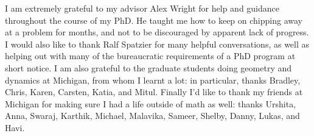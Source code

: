 
I am extremely grateful to my advisor Alex Wright for help and guidance throughout the course of my PhD.
He taught me how to keep on chipping away at a problem for months, and not to be discouraged by apparent lack of progress.
I would also like to thank Ralf Spatzier for many helpful conversations, as well as helping out with many of the bureaucratic requirements of a PhD program at short notice.
I am also grateful to the graduate students doing geometry and dynamics at Michigan, from whom I learnt a lot: in particular, thanks Bradley, Chris, Karen, Carsten, Katia, and Mitul.
Finally I'd like to thank my friends at Michigan for making sure I had a life outside of math as well: thanks Urshita, Anna, Swaraj, Karthik, Michael, Malavika, Sameer, Shelby, Danny, Lukas, and Havi.

